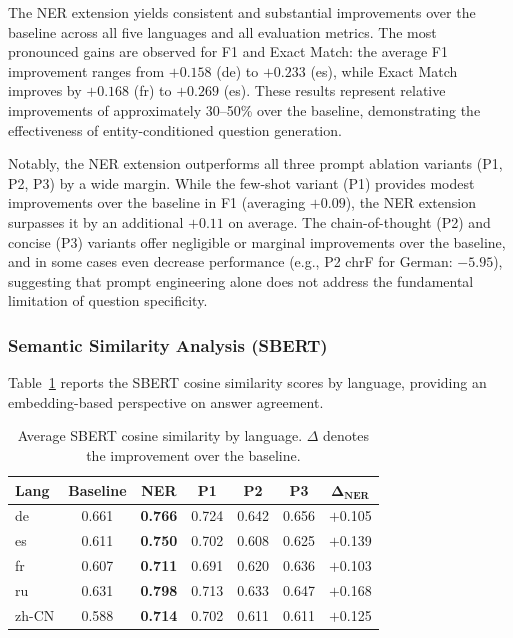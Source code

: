 The NER extension yields consistent and substantial improvements over the baseline across all five languages and all evaluation metrics. The most pronounced gains are observed for F1 and Exact Match: the average F1 improvement ranges from $+0.158$ (de) to $+0.233$ (es), while Exact Match improves by $+0.168$ (fr) to $+0.269$ (es). These results represent relative improvements of approximately 30--50\% over the baseline, demonstrating the effectiveness of entity-conditioned question generation.

Notably, the NER extension outperforms all three prompt ablation variants (P1, P2, P3) by a wide margin. While the few-shot variant (P1) provides modest improvements over the baseline in F1 (averaging $+0.09$), the NER extension surpasses it by an additional $+0.11$ on average. The chain-of-thought (P2) and concise (P3) variants offer negligible or marginal improvements over the baseline, and in some cases even decrease performance (e.g., P2 chrF for German: $-5.95$), suggesting that prompt engineering alone does not address the fundamental limitation of question specificity.

\subsubsection{Semantic Similarity Analysis (SBERT)}

Table~\ref{tab:ner_sbert} reports the SBERT cosine similarity scores by language, providing an embedding-based perspective on answer agreement.

\begin{table}[htbp]
\centering
\caption{Average SBERT cosine similarity by language. $\Delta$ denotes the improvement over the baseline.}
\label{tab:ner_sbert}
\begin{tabular}{l|cc|cccc}
\hline
\textbf{Lang} & \textbf{Baseline} & \textbf{NER} & \textbf{P1} & \textbf{P2} & \textbf{P3} & $\boldsymbol{\Delta}_{\textbf{NER}}$ \\
\hline
de & 0.661 & \textbf{0.766} & 0.724 & 0.642 & 0.656 & $+$0.105 \\
es & 0.611 & \textbf{0.750} & 0.702 & 0.608 & 0.625 & $+$0.139 \\
fr & 0.607 & \textbf{0.711} & 0.691 & 0.620 & 0.636 & $+$0.103 \\
ru & 0.631 & \textbf{0.798} & 0.713 & 0.633 & 0.647 & $+$0.168 \\
zh-CN & 0.588 & \textbf{0.714} & 0.702 & 0.611 & 0.611 & $+$0.125 \\
\hline
\end{tabular}
\end{table}

